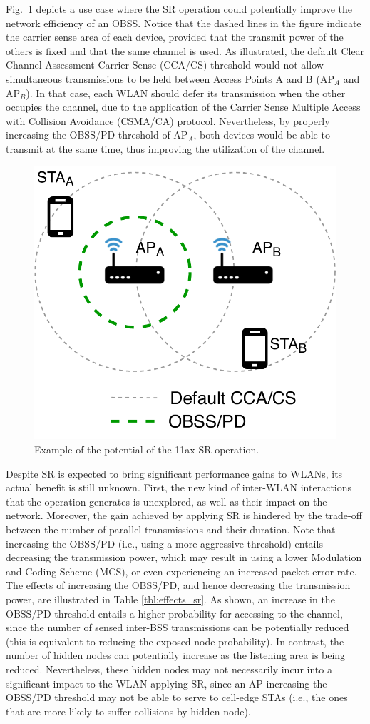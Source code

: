 \documentclass[conference]{IEEEtran}
\begin{document}
	Fig.~\ref{fig:example_sr} depicts a use case where the SR operation could potentially improve the network efficiency of an OBSS. Notice that the dashed lines in the figure indicate the carrier sense area of each device, provided that the transmit power of the others is fixed and that the same channel is used. As illustrated, the default Clear Channel Assessment Carrier Sense (CCA/CS) threshold would not allow simultaneous transmissions to be held between Access Points A and B (AP$_A$ and AP$_B$). In that case, each WLAN should defer its transmission when the other occupies the channel, due to the application of the Carrier Sense Multiple Access with Collision Avoidance (CSMA/CA) protocol. Nevertheless, by properly increasing the OBSS/PD threshold of AP$_A$, both devices would be able to transmit at the same time, thus improving the utilization of the channel.
	\begin{figure}[ht!]
		\centering
		\includegraphics[width=0.6\columnwidth]{fig_1}
		\caption{Example of the potential of the 11ax SR operation.}
		\label{fig:example_sr}
	\end{figure}
	
	Despite SR is expected to bring significant performance gains to WLANs, its actual benefit is still unknown. First, the new kind of inter-WLAN interactions that the operation generates is unexplored, as well as their impact on the network. Moreover, the gain achieved by applying SR is hindered by the trade-off between the number of parallel transmissions and their duration. Note that increasing the OBSS/PD (i.e., using a more aggressive threshold) entails decreasing the transmission power, which may result in using a lower Modulation and Coding Scheme (MCS), or even experiencing an increased packet  error rate. The effects of increasing the OBSS/PD, and hence decreasing the transmission power, are illustrated in Table \ref{tbl:effects_sr}. As shown, an increase in the OBSS/PD threshold entails a higher probability for accessing to the channel, since the number of sensed inter-BSS transmissions can be potentially reduced (this is equivalent to reducing the exposed-node probability). In contrast, the number of hidden nodes can potentially increase as the listening area is being reduced. Nevertheless, these hidden nodes may not necessarily incur into a significant impact to the WLAN applying SR, since an AP increasing the OBSS/PD threshold may not be able to serve to cell-edge STAs (i.e., the ones that are more likely to suffer collisions by hidden node).
	
\end{document}
